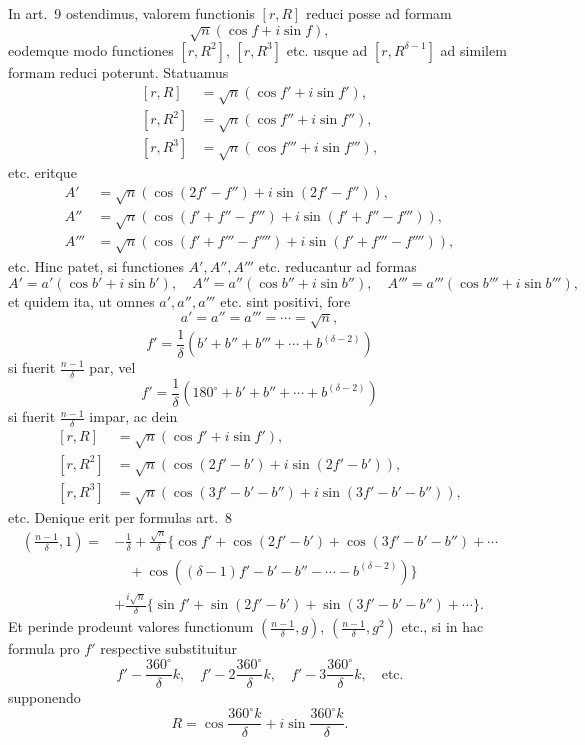 \documentclass[12pt]{article}
\begin{document}
In art.~9 ostendimus, valorem functionis $[r,R]$ reduci posse ad formam
\[
\sqrt n(\cos f+i\sin f),
\]
eodemque modo functiones $[r,R^2]$, $[r,R^3]$ etc. usque ad $[r,R^{\delta-1}]$ ad similem formam reduci poterunt. Statuamus
\[
\begin{aligned}
[r,R]&=\sqrt n(\cos f'+i\sin f'),\\
[r,R^2]&=\sqrt n(\cos f''+i\sin f''),\\
[r,R^3]&=\sqrt n(\cos f'''+i\sin f'''),
\end{aligned}
\]
etc. eritque
\[
\begin{aligned}
A'&=\sqrt n(\cos(2f'-f'')+i\sin(2f'-f'')),\\
A''&=\sqrt n(\cos(f'+f''-f''')+i\sin(f'+f''-f''')),\\
A'''&=\sqrt n(\cos(f'+f'''-f'''')+i\sin(f'+f'''-f'''')),
\end{aligned}
\]
etc. Hinc patet, si functiones $A',A'',A'''$ etc. reducantur ad formas
\[
A'=a'(\cos b'+i\sin b'),\quad
A''=a''(\cos b''+i\sin b''),\quad
A'''=a'''(\cos b'''+i\sin b'''),
\]
et quidem ita, ut omnes $a',a'',a'''$ etc. sint positivi, fore
\[
a'=a''=a'''=\cdots=\sqrt n,
\]
\[
f'=\frac1\delta(b'+b''+b'''+\cdots+b^{(\delta-2)})
\]
si fuerit $\frac{n-1}{\delta}$ par, vel
\[
f'=\frac1\delta(180^\circ+b'+b''+\cdots+b^{(\delta-2)})
\]
si fuerit $\frac{n-1}{\delta}$ impar, ac dein
\[
\begin{aligned}
[r,R]&=\sqrt n(\cos f'+i\sin f'),\\
[r,R^2]&=\sqrt n(\cos(2f'-b')+i\sin(2f'-b')),\\
[r,R^3]&=\sqrt n(\cos(3f'-b'-b'')+i\sin(3f'-b'-b'')),
\end{aligned}
\]
etc. Denique erit per formulas art.~8
\[
\begin{aligned}
\left(\frac{n-1}{\delta},1\right)
={}&-\frac1\delta+\frac{\sqrt n}{\delta}\{\cos f'+\cos(2f'-b')+\cos(3f'-b'-b'')+\cdots\\
&\quad+\cos((\delta-1)f'-b'-b''-\cdots-b^{(\delta-2)})\}\\
&+\frac{i\sqrt n}{\delta}\{\sin f'+\sin(2f'-b')+\sin(3f'-b'-b'')+\cdots\}.
\end{aligned}
\]
Et perinde prodeunt valores functionum $\left(\frac{n-1}{\delta},g\right)$,
$\left(\frac{n-1}{\delta},g^2\right)$ etc., si in hac formula pro $f'$ respective substituitur
\[
f'-\frac{360^\circ}{\delta}k,\quad
f'-2\frac{360^\circ}{\delta}k,\quad
f'-3\frac{360^\circ}{\delta}k,\quad\text{etc.}
\]
supponendo
\[
R=\cos\frac{360^\circ k}{\delta}+i\sin\frac{360^\circ k}{\delta}.
\]
\end{document}
